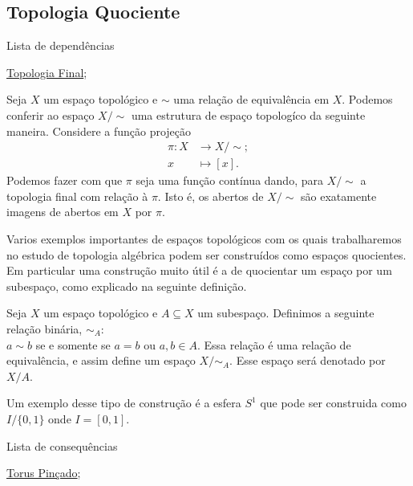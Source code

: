 \subsection{Topologia Quociente}
\label{topologia-quociente-def}
\begin{titlemize}{Lista de dependências}
	\item \hyperref[topologia final]{Topologia Final}; 
\end{titlemize}
\begin{defi}
	Seja \(X\) um espaço topológico e \(\sim\) uma relação de equivalência em \(X\).
	Podemos conferir ao espaço \(X/\sim\) uma estrutura de espaço topologíco da seguinte maneira. Considere a função projeção
	\begin{align*}
		\pi:X&\to X/\sim;\\
		x&\mapsto [x].
	\end{align*}
	Podemos fazer com que \(\pi\) seja uma função contínua dando, para \(X/\sim\) a topologia final com relação à \(\pi\). Isto é, os abertos de \(X/\sim\) são exatamente imagens de abertos em \(X\) por \(\pi\).  
\end{defi}
Varios exemplos importantes de espaços topológicos com os quais trabalharemos no estudo de topologia algébrica podem ser construídos como espaços quocientes. Em particular uma construção muito útil é a de quocientar um espaço por um subespaço, como explicado na seguinte definição.
\begin{defi}
	Seja \(X\) um espaço topológico e \(A \subseteq X\) um subespaço. Definimos a seguinte relação binária, \(\sim_{A}\):\\
	\(a\sim b\) se e somente se \(a=b\) ou \(a,b\in A\). Essa relação é uma relação de equivalência, e assim define um espaço \(X/\sim_A\). Esse espaço será denotado por \(X/A\). 
\end{defi}
Um exemplo desse tipo de construção é a esfera \(S^1\) que pode ser construida como \(I/\{0,1\}\) onde \(I=[0,1]\). 
\begin{titlemize}{Lista de consequências}
	\item \hyperref[pinched-torus-ex]{Torus Pinçado};
\end{titlemize}


